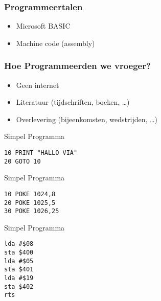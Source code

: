 \documentclass[aspectratio=43]{uva-inf-presentation}
\begin{document}
\begin{frame}
\frametitle{Programmeertalen}

\begin{itemize}
\item Microsoft BASIC
\item Machine code (assembly)
\end{itemize}

\end{frame}


\begin{frame}
\frametitle{Hoe Programmeerden we vroeger?}

\begin{itemize}
\item Geen internet
\item Literatuur (tijdschriften, boeken, \dots)
\item Overlevering (bijeenkomsten, wedstrijden, \dots)
\end{itemize}

\end{frame}


\begin{frame}[fragile]{Simpel Programma}

\begin{lstlisting}
10 PRINT "HALLO VIA"
20 GOTO 10
\end{lstlisting}

\end{frame}


\begin{frame}[fragile]{Simpel Programma}

\begin{lstlisting}
10 POKE 1024,8
20 POKE 1025,5
30 POKE 1026,25
\end{lstlisting}

\end{frame}


\begin{frame}[fragile]{Simpel Programma}

\begin{lstlisting}
lda #$08
sta $400
lda #$05
sta $401
lda #$19
sta $402
rts
\end{lstlisting}

\end{frame}
\end{document}
